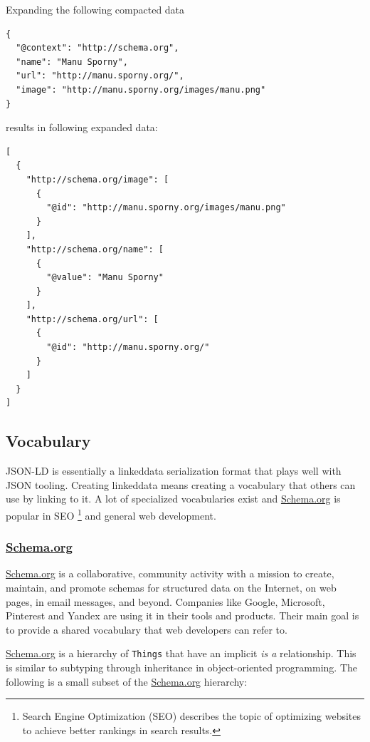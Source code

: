Expanding the following compacted data

\lstset{language=JSON}
\begin{lstlisting}[caption=Compacted and easy-to-read data of a person.]
{
  "@context": "http://schema.org",
  "name": "Manu Sporny",
  "url": "http://manu.sporny.org/",
  "image": "http://manu.sporny.org/images/manu.png"
}
\end{lstlisting}

results in following expanded data:

\lstset{language=JSON}
\begin{lstlisting}[caption=Expanded data of a person that is easy to process for machines.]
[
  {
    "http://schema.org/image": [
      {
        "@id": "http://manu.sporny.org/images/manu.png"
      }
    ],
    "http://schema.org/name": [
      {
        "@value": "Manu Sporny"
      }
    ],
    "http://schema.org/url": [
      {
        "@id": "http://manu.sporny.org/"
      }
    ]
  }
]
\end{lstlisting}

\subsection{Vocabulary}
JSON-LD is essentially a \gls{linkeddata} serialization format that plays well with JSON tooling. Creating \gls{linkeddata} means creating a vocabulary that others can use by linking to it. A lot of specialized vocabularies exist and \url{Schema.org} is popular in SEO \footnote{Search Engine Optimization (SEO) describes the topic of optimizing websites to achieve better rankings in search results.} and general web development.

\subsubsection{\url{Schema.org}}\label{schemaorg}
\url{Schema.org} is a collaborative, community activity with a mission to create, maintain, and promote schemas for structured data on the Internet, on web pages, in email messages, and beyond. \citep{welcomeschemaorg} Companies like Google, Microsoft, Pinterest and Yandex are using it in their tools and products.
Their main goal is to provide a shared vocabulary that web developers can refer to.

\url{Schema.org} is a hierarchy of \lstinline{Things} that have an implicit \textit{is a} relationship. This is similar to subtyping through inheritance in object-oriented programming. The following is a small subset of the \url{Schema.org} hierarchy:

